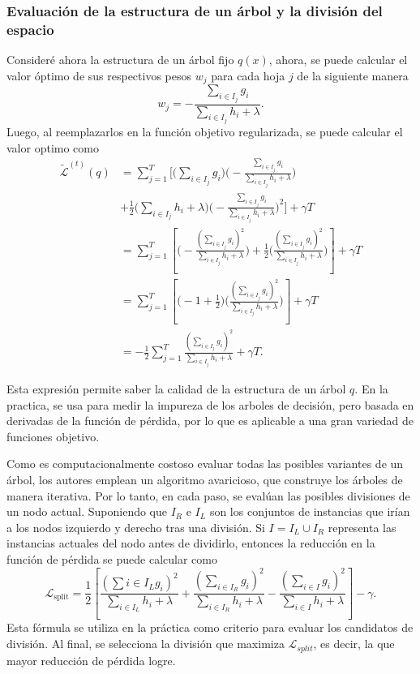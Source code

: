 \documentclass[12pt,letterpaper]{article}
\begin{document}
\subsubsection{Evaluación de la estructura de un árbol y la división del espacio}
Consideré ahora la estructura de un árbol fijo $q(x)$, ahora, se puede calcular el valor óptimo de sus respectivos pesos $w_j$ para cada hoja $j$ de la siguiente manera
\begin{equation}
    w_j = -\frac{\sum_{i\in I_j} g_i}{ \sum_{i\in I_j} h_i+\lambda}.
\end{equation}
Luego, al reemplazarlos en la función objetivo regularizada, se puede calcular el valor optimo como
\begin{align}
    \tilde{\mathcal{L}}^{(t)}(q) &= \sum_{j=1}^{T} \bigg[ \big( \sum_{i \in I_j} g_i \big) \bigg(-\frac{\sum_{i\in I_j} g_i}{ \sum_{i\in I_j} h_i+\lambda}\bigg) \\&+ \frac{1}{2} \big( \sum_{i \in I_j} h_i + \lambda \big) \bigg( -\frac{\sum_{i\in I_j} g_i}{ \sum_{i\in I_j} h_i+\lambda} \bigg)^2 \bigg] + \gamma T\\
     &= \sum_{j=1}^{T} \left[  \bigg(-\frac{ (\sum_{i\in I_j} g_i)^2}{ \sum_{i\in I_j} h_i+\lambda}\bigg) + \frac{1}{2} \bigg( \frac{ (\sum_{i\in I_j} g_i)^2}{ \sum_{i\in I_j} h_i+\lambda} \bigg) \right] + \gamma T\\
     &=\sum_{j=1}^{T} \left[ \big(-1 + \frac{1}{2} \big)  \bigg( \frac{ (\sum_{i\in I_j} g_i)^2}{ \sum_{i\in I_j} h_i+\lambda} \bigg)\right]+ \gamma T\\
    &=-\frac{1}{2}\sum_{j=1}^{T} \frac{ (\sum_{i\in I_j} g_i)^2}{ \sum_{i\in I_j} h_i+\lambda} + \gamma T.
\end{align}

Esta expresión permite saber la calidad de la estructura de un árbol $q$. En la practica, se usa para medir la impureza de los arboles de decisión, pero basada en derivadas de la función de pérdida, por lo que es aplicable a una gran variedad de funciones objetivo.

Como es computacionalmente costoso evaluar todas las posibles variantes de un árbol, los autores \cite{chen2016xgboost} emplean un algoritmo avaricioso, que construye los árboles de manera iterativa. Por lo tanto, en cada paso, se evalúan las posibles divisiones de un nodo actual. Suponiendo que $I_R$ e $I_L$ son los conjuntos de instancias que irían a los nodos izquierdo y derecho tras una división. Si $I = I_L \cup I_R $ representa las instancias actuales del nodo antes de dividirlo, entonces la reducción en la función de pérdida se puede calcular como
\begin{equation}
\mathcal{L}_{\text{split}} = \frac{1}{2} \left[ \frac{\left( \sum{i \in I_L} g_i \right)^2}{\sum_{i \in I_L} h_i + \lambda} + \frac{\left( \sum_{i \in I_R} g_i \right)^2}{\sum_{i \in I_R} h_i + \lambda} - \frac{\left( \sum_{i \in I} g_i \right)^2}{\sum_{i \in I} h_i + \lambda} \right] - \gamma.
\end{equation}
Esta fórmula se utiliza en la práctica como criterio para evaluar los candidatos de división. Al final, se selecciona la división que maximiza $\mathcal{L}_{split}$, es decir, la que mayor reducción de pérdida logre.
\end{document}

